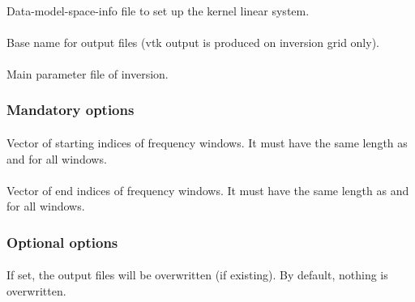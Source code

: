 \paragraph{}
Data-model-space-info file to set up the kernel linear system.
\paragraph{}
Base name for output files (vtk output is produced on inversion grid only).
\paragraph{}
Main parameter file of inversion.
\subsubsection{Mandatory options}
\paragraph{}
Vector of starting indices of  frequency windows. It must have the same length  
as  and  for all windows.
\paragraph{}
Vector of end indices of  frequency windows. It must have the same length  
as  and  for all windows.
\subsubsection{Optional options}
\paragraph{}
If set, the output files will be overwritten (if existing). By default, nothing is overwritten.
%
%
